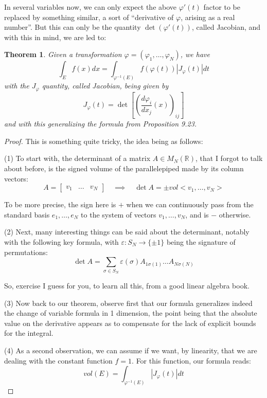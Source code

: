 \documentclass[12pt]{amsbook}
\newtheorem{theorem}{Theorem}[chapter]
\begin{document}
In several variables now, we can only expect the above $\varphi'(t)$ factor to be replaced by something similar, a sort of ``derivative of $\varphi$, arising as a real number''. But this can only be the quantity $\det(\varphi'(t))$, called Jacobian, and with this in mind, we are led to:

\begin{theorem}
Given a transformation $\varphi=(\varphi_1,\ldots,\varphi_N)$, we have
$$\int_Ef(x)dx=\int_{\varphi^{-1}(E)}f(\varphi(t))|J_\varphi(t)|dt$$
with the $J_\varphi$ quantity, called Jacobian, being given by
$$J_\varphi(t)=\det\left[\left(\frac{d\varphi_i}{dx_j}(x)\right)_{ij}\right]$$ 
and with this generalizing the formula from Proposition 9.23.
\end{theorem}

\begin{proof}
This is something quite tricky, the idea being as follows:

\medskip

(1) To start with, the determinant of a matrix $A\in M_N(\mathbb R)$, that I forgot to talk about before, is the signed volume of the parallelepiped made by its column vectors:
$$A=\begin{bmatrix}v_1&\ldots&v_N\end{bmatrix}\quad\implies\quad \det A=\pm vol<v_1,\ldots,v_N>$$

To be more precise, the sign here is $+$ when we can continuously pass from the standard basis $e_1,\ldots,e_N$ to the system of vectors $v_1,\ldots,v_N$, and is $-$ otherwise.

\medskip

(2) Next, many interesting things can be said about the determinant, notably with the following key formula, with $\varepsilon:S_N\to\{\pm1\}$ being the signature of permutations:
$$\det A=\sum_{\sigma\in S_N}\varepsilon(\sigma)A_{1\sigma(1)}\ldots A_{N\sigma(N)}$$

So, exercise I guess for you, to learn all this, from a good linear algebra book.

\medskip

(3) Now back to our theorem, observe first that our formula generalizes indeed the change of variable formula in 1 dimension, the point being that the absolute value on the derivative appears as to compensate for the lack of explicit bounds for the integral.

\medskip 

(4) As a second observation, we can assume if we want, by linearity, that we are dealing with the constant function $f=1$. For this function, our formula reads:
$$vol(E)=\int_{\varphi^{-1}(E)}|J_\varphi(t)|dt$$


\end{proof}
\end{document}
